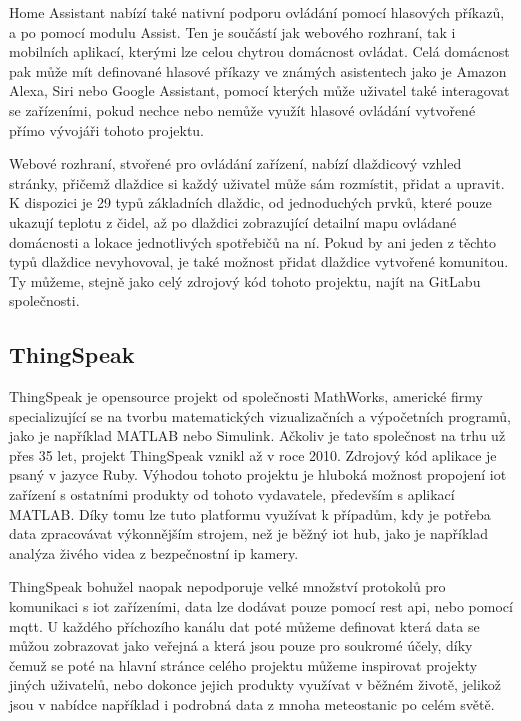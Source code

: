 Home Assistant nabízí také nativní podporu ovládání pomocí hlasových příkazů, a po pomocí modulu Assist. Ten je součástí jak webového rozhraní, tak i mobilních aplikací, kterými lze celou chytrou domácnost ovládat. Celá domácnost pak může mít definované hlasové příkazy ve známých asistentech jako je Amazon Alexa, Siri nebo Google Assistant, pomocí kterých může uživatel také interagovat se zařízeními, pokud nechce nebo nemůže využít hlasové ovládání vytvořené přímo vývojáři tohoto projektu.

Webové rozhraní, stvořené pro ovládání zařízení, nabízí dlaždicový vzhled stránky, přičemž dlaždice si každý uživatel může sám rozmístit, přidat a upravit. K dispozici je 29 typů základních dlaždic, od jednoduchých prvků, které pouze ukazují teplotu z čidel, až po dlaždici zobrazující detailní mapu ovládané domácnosti a lokace jednotlivých spotřebičů na ní. Pokud by ani jeden z těchto typů dlaždice nevyhovoval, je také možnost přidat dlaždice vytvořené komunitou. Ty můžeme, stejně jako celý zdrojový kód tohoto projektu, najít na GitLabu společnosti.

\subsection{ThingSpeak}

ThingSpeak je opensource projekt od společnosti MathWorks, americké firmy specializující se na tvorbu matematických vizualizačních a výpočetních programů, jako je například MATLAB nebo Simulink. Ačkoliv je tato společnost na trhu už přes 35 let, projekt ThingSpeak vznikl až v roce 2010. Zdrojový kód aplikace je psaný v jazyce Ruby. Výhodou tohoto projektu je hluboká možnost propojení \acrshort{iot} zařízení s ostatními produkty od tohoto vydavatele, především s aplikací MATLAB. Díky tomu lze tuto platformu využívat k případům, kdy je potřeba data zpracovávat výkonnějším strojem, než je běžný \acrshort{iot} hub, jako je například analýza živého videa z bezpečnostní \acrshort{ip} kamery.

ThingSpeak bohužel naopak nepodporuje velké množství protokolů pro komunikaci s \acrshort{iot} zařízeními, data lze dodávat pouze pomocí \acrshort{rest} \acrshort{api}, nebo pomocí \acrshort{mqtt}. U každého příchozího kanálu dat poté můžeme definovat která data se můžou zobrazovat jako veřejná a která jsou pouze pro soukromé účely, díky čemuž se poté na hlavní stránce celého projektu můžeme inspirovat projekty jiných uživatelů, nebo dokonce jejich produkty využívat v běžném životě, jelikož jsou v nabídce například i podrobná data z mnoha meteostanic po celém světě. 

